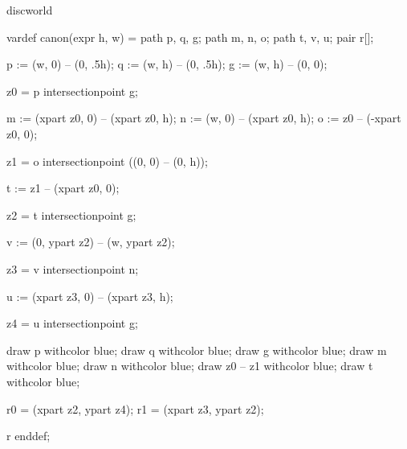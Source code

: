 %
%
%


\startenvironment discworld

	\startMPdefinitions
		vardef canon(expr h, w) =
			path p, q, g;
			path m, n, o;
			path t, v, u;
			pair r[];

			p := (w,  0) -- (0, .5h); %
			q := (w,  h) -- (0, .5h); %
			g := (w,  h) -- (0, 0); %

			z0 = p intersectionpoint g; %

			m := (xpart z0, 0) -- (xpart z0, h); %
			n := (w, 0) -- (xpart z0, h); %
			o := z0 -- (-xpart z0, 0); %

			z1 = o intersectionpoint ((0, 0) -- (0, h)); %

			t := z1 -- (xpart z0, 0); %

			z2 = t intersectionpoint g; %

			v := (0, ypart z2) -- (w, ypart z2); %

			z3 = v intersectionpoint n; %

			u := (xpart z3, 0) -- (xpart z3, h); %

			z4 = u intersectionpoint g; %

			draw p withcolor blue;
			draw q withcolor blue;
			draw g withcolor blue;
			draw m withcolor blue;
			draw n withcolor blue;
			draw z0 -- z1 withcolor blue;
			draw t withcolor blue;

			r0 = (xpart z2, ypart z4); %
			r1 = (xpart z3, ypart z2); %

			r
		enddef;

	\stopMPdefinitions

\stopenvironment

